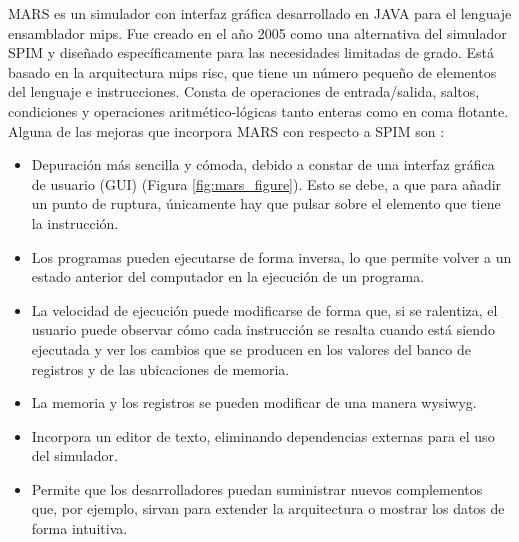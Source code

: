 MARS \cite{vollmar2006mars} es un simulador con interfaz gráfica desarrollado en JAVA para el lenguaje \gls{ensamblador} \acrshort{mips}. Fue creado en el año 2005 como una alternativa del simulador SPIM y diseñado específicamente para las necesidades limitadas de grado. Está basado en la arquitectura \acrshort{mips} \acrfull{risc}, que tiene un número pequeño de elementos del lenguaje e instrucciones. Consta de operaciones de entrada/salida, saltos, condiciones y operaciones aritmético-lógicas tanto enteras como en coma flotante. Alguna de las mejoras que incorpora MARS con respecto a SPIM son \cite{vegdahl2008mipspilot}: 

\begin{itemize}

\item Depuración más sencilla y cómoda, debido a constar de una interfaz gráfica de usuario (GUI) (Figura \ref{fig:mars_figure}). Esto se debe, a que para añadir un punto de ruptura, únicamente hay que pulsar sobre el elemento que tiene la instrucción.

\item Los programas pueden ejecutarse de forma inversa, lo que permite volver a un estado anterior del computador en la ejecución de un programa.

\item La velocidad de ejecución puede modificarse de forma que, si se ralentiza, el usuario puede observar cómo cada instrucción se resalta cuando está siendo ejecutada y ver los cambios que se producen en los valores del banco de registros y de las ubicaciones de memoria.

\item  La memoria y los registros se pueden modificar de una manera \acrfull{wysiwyg}.

\item Incorpora un editor de texto, eliminando dependencias externas para el uso del simulador.

\item Permite que los desarrolladores puedan suministrar nuevos complementos que, por ejemplo, sirvan para extender la arquitectura o mostrar los datos de forma intuitiva.

\end{itemize}

